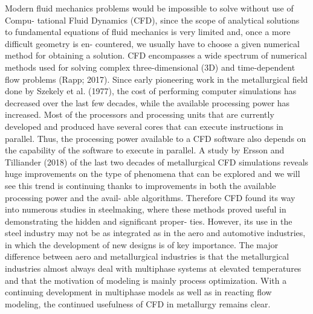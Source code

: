 Modern fluid mechanics problems would be impossible to solve without use of Compu- tational Fluid Dynamics (CFD), since the scope of analytical solutions to fundamental equations of fluid mechanics is very limited and, once a more difficult geometry is en- countered, we usually have to choose a given numerical method for obtaining a solution. CFD encompasses a wide spectrum of numerical methods used for solving complex three-dimensional (3D) and time-dependent flow problems (Rapp; 2017). Since early pioneering work in the metallurgical field done by Szekely et al. (1977), the cost of performing computer simulations has decreased over the last few decades, while the available processing power has increased. Most of the processors and processing units that are currently developed and produced have several cores that can execute instructions in parallel. Thus, the processing power available to a CFD software also depends on the capability of the software to execute in parallel. A study by Ersson and Tilliander (2018) of the last two decades of metallurgical CFD simulations reveals huge improvements on the type of phenomena that can be explored and we will see this trend is continuing thanks to improvements in both the available processing power and the avail- able algorithms. Therefore CFD found its way into numerous studies in steelmaking, where these methods proved useful in demonstrating the hidden and significant proper- ties. However, its use in the steel industry may not be as integrated as in the aero and automotive industries, in which the development of new designs is of key importance. The major difference between aero and metallurgical industries is that the metallurgical industries almost always deal with multiphase systems at elevated temperatures and that the motivation of modeling is mainly process optimization. With a continuing development in multiphase models as well as in reacting flow modeling, the continued usefulness of CFD in metallurgy remains clear.

